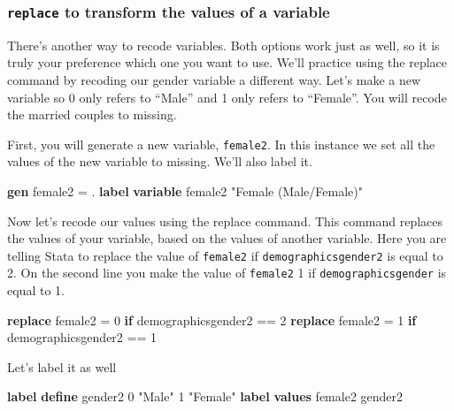 \documentclass[
]{book}
\newenvironment{Shaded}{\begin{snugshade}}{\end{snugshade}}
\newcommand{\KeywordTok}[1]{\textcolor[rgb]{0.13,0.29,0.53}{\textbf{#1}}}
\newcommand{\NormalTok}[1]{#1}
\newcommand{\StringTok}[1]{\textcolor[rgb]{0.31,0.60,0.02}{#1}}
\begin{document}
\hypertarget{replace}{%
\subsubsection*{\texorpdfstring{\texttt{replace} to transform the values of a variable}{replace to transform the values of a variable}}\label{replace}}

There's another way to recode variables. Both options work just as well, so it is truly your preference which one you want to use. We'll practice using the replace command by recoding our gender variable a different way. Let's make a new variable so 0 only refers to ``Male'' and 1 only refers to ``Female''. You will recode the married couples to missing.

First, you will generate a new variable, \texttt{female2}. In this instance we set all the values of the new variable to missing. We'll also label it.

\begin{Shaded}
\begin{Highlighting}[]
\KeywordTok{gen}\NormalTok{ female2 = . }
\KeywordTok{label} \KeywordTok{variable}\NormalTok{ female2 }\StringTok{"Female (Male/Female)"}
\end{Highlighting}
\end{Shaded}

Now let's recode our values using the replace command. This command replaces the values of your variable, based on the values of another variable. Here you are telling Stata to replace the value of \texttt{female2} if \texttt{demographicsgender2} is equal to 2. On the second line you make the value of \texttt{female2} 1 if \texttt{demographicsgender} is equal to 1.

\begin{Shaded}
\begin{Highlighting}[]
\KeywordTok{replace}\NormalTok{ female2 = 0 }\KeywordTok{if}\NormalTok{ demographicsgender2 == 2 }
\KeywordTok{replace}\NormalTok{ female2 = 1 }\KeywordTok{if}\NormalTok{ demographicsgender2 == 1}
\end{Highlighting}
\end{Shaded}

Let's label it as well

\begin{Shaded}
\begin{Highlighting}[]
\KeywordTok{label} \KeywordTok{define}\NormalTok{ gender2 0 }\StringTok{"Male"}\NormalTok{ 1 }\StringTok{"Female"}
\KeywordTok{label} \KeywordTok{values}\NormalTok{ female2 gender2}
\end{Highlighting}
\end{Shaded}
\end{document}
